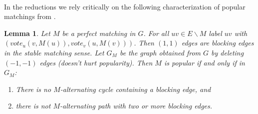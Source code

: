 \documentclass[letterpaper,12pt,oneside,onecolumn]{article}
\newtheorem{lemma}[fact]{Lemma}
\begin{document}
\paragraph{}
In the reductions we rely critically on the following characterization of popular matchings from \cite{huang2011popular}.
\begin{lemma}\label{lemma:char}
\cite{huang2011popular} Let $M$ be a perfect matching in $G$. For all $uv \in E\backslash M$ label $uv$ with $(vote_u(v,M(u)), vote_v(u,M(v)))$. Then $(1,1)$ edges are blocking edges in the stable matching sense. Let $G_M$ be the graph obtained from $G$ by deleting $(-1,-1)$ edges (doesn't hurt popularity). Then $M$ is popular if and only if in $G_M$:
\begin{enumerate}
\item There is no $M$-alternating cycle containing a blocking edge, and
\item there is not $M$-alternating path with two or more blocking edges.
\end{enumerate}
\end{lemma}
\end{document}
